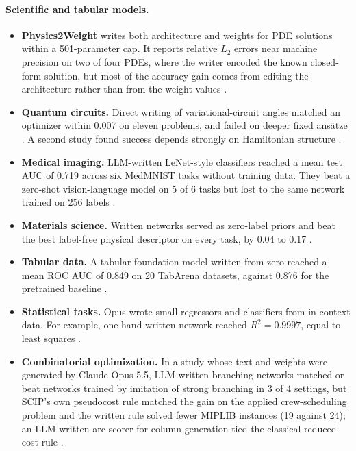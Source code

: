 \paragraph{Scientific and tabular models.}
\begin{itemize}[leftmargin=*,itemsep=2pt]
\item \textbf{Physics2Weight} writes both architecture and weights for PDE solutions within a 501-parameter cap. It reports relative $L_2$ errors near machine precision on two of four PDEs, where the writer encoded the known closed-form solution, but most of the accuracy gain comes from editing the architecture rather than from the weight values \citep{ax2611_12954}.
\item \textbf{Quantum circuits.} Direct writing of variational-circuit angles matched an optimizer within 0.007 on eleven problems, and failed on deeper fixed ansätze \citep{ax2611_11537}. A second study found success depends strongly on Hamiltonian structure \citep{ax2611_17246}.
\item \textbf{Medical imaging.} LLM-written LeNet-style classifiers reached a mean test AUC of 0.719 across six MedMNIST tasks without training data. They beat a zero-shot vision-language model on 5 of 6 tasks but lost to the same network trained on 256 labels \citep{ax2611_12066}.
\item \textbf{Materials science.} Written networks served as zero-label priors and beat the best label-free physical descriptor on every task, by 0.04 to 0.17 \citep{ax2611_22013}.
\item \textbf{Tabular data.} A tabular foundation model written from zero reached a mean ROC AUC of 0.849 on 20 TabArena datasets, against 0.876 for the pretrained baseline \citep{ax2611_20174}.
\item \textbf{Statistical tasks.} Opus wrote small regressors and classifiers from in-context data. For example, one hand-written network reached $R^2 = 0.9997$, equal to least squares \citep{ax2611_19292}.
\item \textbf{Combinatorial optimization.} In a study whose text and weights were generated by Claude Opus 5.5, LLM-written branching networks matched or beat networks trained by imitation of strong branching in 3 of 4 settings, but SCIP's own pseudocost rule matched the gain on the applied crew-scheduling problem and the written rule solved fewer MIPLIB instances (19 against 24); an LLM-written arc scorer for column generation tied the classical reduced-cost rule \citep{ax2611_09559}.
\end{itemize}

